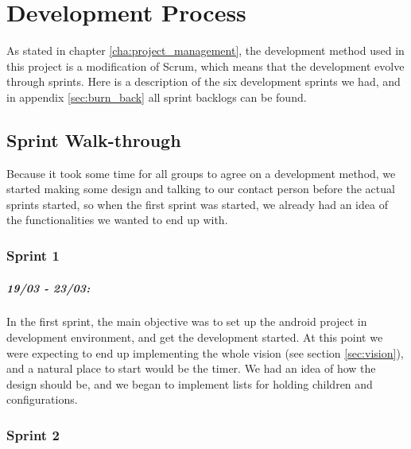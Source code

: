 \chapter{Development Process}
As stated in chapter \ref{cha:project_management}, the development method used in this project is a modification of Scrum, which means that the development evolve through sprints. Here is a description of the six development sprints we had, and in appendix \ref{sec:burn_back} all sprint backlogs can be found.

\section{Sprint Walk-through}
Because it took some time for all groups to agree on a development method, we started making some design and talking to our contact person before the actual sprints started, so when the first sprint was started, we already had an idea of the functionalities we wanted to end up with.

\subsection*{Sprint 1}
\paragraph{19/03 - 23/03:}
In the first sprint, the main objective was to set up the android project in development environment, and get the development started. At this point we were expecting to end up implementing the whole vision (see section \ref{sec:vision}), and a natural place to start would be the timer. We had an idea of how the design should be, and we began to implement lists for holding children and configurations.

\subsection*{Sprint 2}
